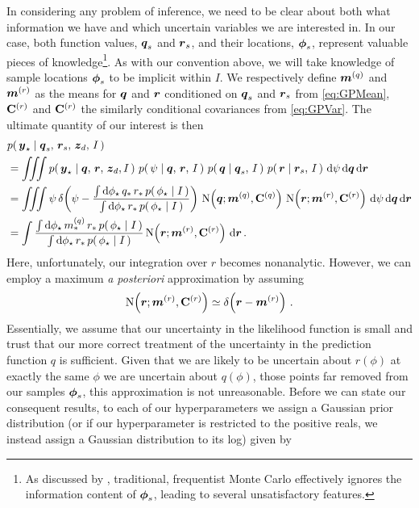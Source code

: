 \documentclass{acmtrans2m}
\begin{document}
In considering any problem of inference, we need to be clear about both what information we have and which uncertain variables we are interested in. In our case, both function values, $\boldsymbol{q}_s$ and $\boldsymbol{r}_s$, and their locations, $\boldsymbol{\phi}_s$, represent valuable pieces of knowledge\footnote{As discussed by , traditional, frequentist Monte Carlo effectively ignores the information content of $\boldsymbol{\phi}_s$, leading to several unsatisfactory features.}. As with our convention above, we will take knowledge of sample locations $\boldsymbol{\phi}_s$ to be implicit within $I$. We respectively define $\boldsymbol{m}^{(q)}$ and $\boldsymbol{m}^{(r)}$ as the means for $\boldsymbol{q}$ and $\boldsymbol{r}$ conditioned on $\boldsymbol{q}_s$ and $\boldsymbol{r}_s$ from \eqref{eq:GPMean}, $\mathbf{C}^{(r)}$ and $\mathbf{C}^{(r)}$ the similarly conditional covariances from \eqref{eq:GPVar}. The ultimate quantity of our interest is then
\begin{align}
&\p{\vyst}{\vect{q}_s,\,\vect{r}_s,\,\vzD,\,I} \nonumber\\  
& = \iiint \p{\vyst}{\vect{q},\,\vect{r},\,\vzD,I}\,\p{\psi}{\vect{q},\,\vect{r},\,I}\,\p{\vect{q}}{\vect{q}_s,\,I}\,\p{\vect{r}}{\vect{r}_s,\,I}\,\ud\psi\, \ud \vect{q}\,\ud \vect{r} \nonumber\\
& = \iiint \psi\,\dd{\psi}{\frac{\int \ud\phst\,q_\ast\,r_\ast\,\p{\phst}{I}}
{\int \ud\phst\,r_\ast\,\p{\phst}{I}}}\, \N{\vect{q}}{\vect{m}^{(q)}}{\mat{C}^{(q)}}\, \N{\vect{r}}{\vect{m}^{(r)}}{\mat{C}^{(r)}}\,\ud\psi\, \ud \vect{q}\,\ud \vect{r} \nonumber \\
& = \int \frac{\int \ud\phst\,m^{(q)}_\ast\,r_\ast\,\p{\phst}{I}}
{\int \ud\phst\,r_\ast\,\p{\phst}{I}}\, \N{\vect{r}}{\vect{m}^{(r)}}{\mat{C}^{(r)}}\,\ud \vect{r}\,.
\end{align}
Here, unfortunately, our integration over $r$ becomes nonanalytic. However, we can employ a maximum {\it a posteriori} approximation by assuming
$$
\text{N}\!\left(\boldsymbol{r};\boldsymbol{m}^{(r)},\mathbf{C}^{(r)}\right) \simeq \delta\!\left(\boldsymbol{r}-\boldsymbol{m}^{(r)}\right)\,.
$$
Essentially, we assume that our uncertainty in the likelihood function is small and trust that our more correct treatment of the uncertainty in the prediction function $q$ is sufficient. Given that we are likely to be uncertain about $r(\phi)$ at exactly the same $\phi$ we are uncertain about $q(\phi)$, those points far removed from our samples $\boldsymbol{\phi}_s$, this approximation is not unreasonable.  Before we can state our consequent results, to each of our hyperparameters we assign a Gaussian prior distribution (or if our hyperparameter is restricted to the positive reals, we instead assign a Gaussian distribution to its log) given by
\end{document}
